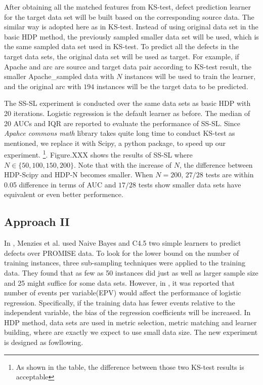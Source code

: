 After obtaining all the matched features from KS-test, defect prediction learner for the target data set will be built based on the corresponding source data. The similar way is adopted here as in KS-test. Instead of using original data set in the basic HDP method, the previously sampled smaller data set will be used, which is the same sampled data set used in KS-test. To predict all the defects in the target data sets, the original data set will be used as target. For example, if Apache and arc are source and target data pair according to KS-test result, the smaller Apache\_sampled data with $N$ instances will be used to train the learner, and the original arc with $194$ instances will be the target data to be predicted.

The SS-SL experiment is conducted over the same data sets as basic HDP with 20 iterations. Logistic regression is the default learner as before. The median of 20 AUCs and IQR are reported to evaluate the performance of SS-SL. Since {\it Apahce commons math} library takes quite long time to conduct KS-test as mentioned, we replace it with Scipy, a python package, to speed up our experiment. \footnote{As shown in the table, the difference between those two KS-test results is acceptable}. Figure.XXX shows the results of SS-SL where $N \in \{50,100,150,200\}$. Note that with the increase of $N$, the difference between HDP-Scipy and HDP-N becomes smaller. When $N=200$, $27/28$ tests are within 0.05 difference in terms of AUC and $17/28$ tests show smaller data sets have equivalent or even better performence.

\subsection{Approach II}

In \cite{menzies2008implications}, Menzies et al. used Naive Bayes and C4.5 two simple learners to predict defects over PROMISE data. To look for the lower bound on the number of training instances, three sub-sampling techniques were applied to the training data. They found that as few as 50 instances did just as well as larger sample size and 25 might suffice for some data sets. However, in \cite{peduzzi1996simulation}, it was reported that number of events per variable(EPV) would affect the performance of logistic regression. Specifically, if the training data has fewer events relative to the independent variable, the bias of the regression coefficients will be increased.  In HDP method, data sets are used in metric selection, metric matching and learner building, where are exactly we expect to use small data size. The new experiment is designed as fowllowing.

